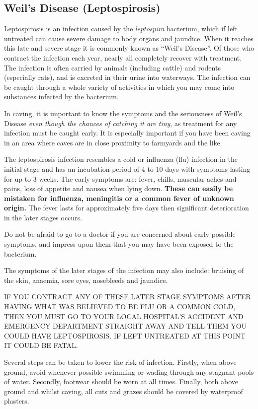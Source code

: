 \documentclass[a4paper,11pt]{article}
\begin{document}
\subsection*{Weil's Disease (Leptospirosis)}

Leptospirosis is an infection caused by the {\em leptospira} bacterium, which
if left untreated can cause severe damage to body organs and jaundice. When it
reaches this late and severe stage it is commonly known as ``Weil's Disease''. Of
those who contract the infection each year, nearly all completely recover with
treatment. The infection is often carried by animals (including cattle) and
rodents (especially rats), and is excreted in their urine into waterways. The
infection can be caught through a whole variety of activities in which you may
come into substances infected by the bacterium.

In caving, it is important to know the symptoms and the seriousness of Weil's
Disease {\em even though the chances of catching it are tiny}, as treatment for any
infection must be caught early.  It is especially important if you have been
caving in an area where caves are in close proximity to farmyards and the like.

The leptospirosis infection resembles a cold or influenza (flu) infection in
the initial stage and has an incubation period of 4 to 10 days with symptoms
lasting for up to 3 weeks. The early symptoms are: fever, chills, muscular
aches and pains, loss of appetite and nausea when lying down. {\bf These can easily
be mistaken for influenza, meningitis or a common fever of unknown origin.} The
fever lasts for approximately five days then significant deterioration in the
later stages occurs.

Do not be afraid to go to a doctor if you are concerned about early possible
symptoms, and impress upon them that you may have been exposed to the bacterium.

The symptoms of the later stages of the infection may also include: bruising of
the skin, anaemia, sore eyes, nosebleeds and jaundice.

IF YOU CONTRACT ANY OF THESE LATER STAGE SYMPTOMS AFTER HAVING WHAT WAS
BELIEVED TO BE FLU OR A COMMON COLD, THEN YOU MUST GO TO YOUR LOCAL HOSPITAL'S
ACCIDENT AND EMERGENCY DEPARTMENT STRAIGHT AWAY AND TELL THEM YOU COULD HAVE
LEPTOSPIROSIS. IF LEFT UNTREATED AT THIS POINT IT COULD BE FATAL.

Several steps can be taken to lower the risk of infection. Firstly, when above
ground, avoid whenever possible swimming or wading through any stagnant pools
of water. Secondly, footwear should be worn at all times.  Finally, both above
ground and whilst caving, all cuts and grazes should be covered by waterproof
plasters. 

\newpage

\end{document}
